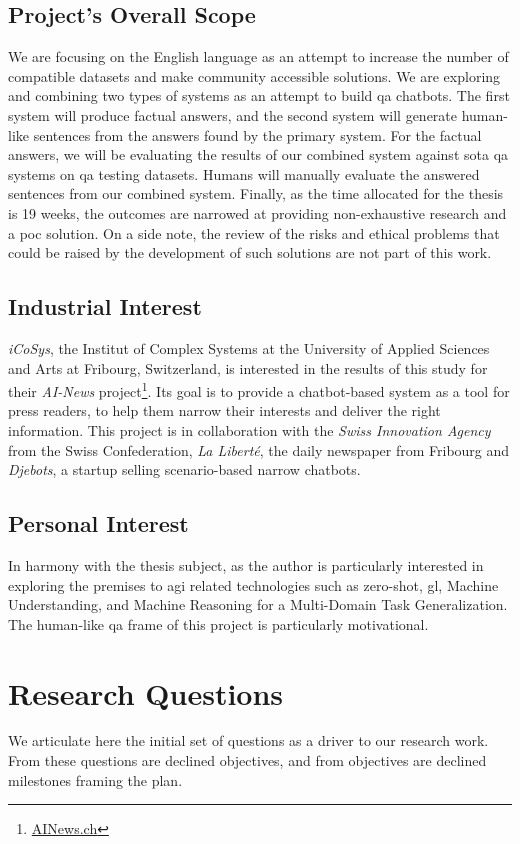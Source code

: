 \subsection{Project's Overall Scope}
We are focusing on the English language as an attempt to increase the number of compatible datasets and make community accessible solutions. We are exploring and combining two types of systems as an attempt to build \gls{qa} chatbots. The first system will produce factual answers, and the second system will generate human-like sentences from the answers found by the primary system. For the factual answers, we will be evaluating the results of our combined system against \gls{sota} \gls{qa} systems on \gls{qa} testing datasets. Humans will manually evaluate the answered sentences from our combined system. Finally, as the time allocated for the thesis is 19 weeks, the outcomes are narrowed at providing non-exhaustive research and a \gls{poc} solution. On a side note, the review of the risks and ethical problems that could be raised by the development of such solutions are not part of this work.


\subsection{Industrial Interest}
\textit{iCoSys}, the Institut of Complex Systems at the University of Applied Sciences and Arts at Fribourg, Switzerland, is interested in the results of this study for their \textit{AI-News} project\footnote{\url{AINews.ch}}. Its goal is to provide a chatbot-based system as a tool for press readers, to help them narrow their interests and deliver the right information. This project is in collaboration with the \textit{Swiss Innovation Agency} from the Swiss Confederation, \textit{La Liberté}, the daily newspaper from Fribourg and \textit{Djebots}, a startup selling scenario-based narrow chatbots.

\subsection{Personal Interest}
In harmony with the thesis subject, as the author is particularly interested in exploring the premises to \gls{agi} related technologies such as \gls{zero-shot}, \gls{gl}, Machine Understanding, and Machine Reasoning for a Multi-Domain Task Generalization. The human-like \gls{qa} frame of this project is particularly motivational.

\section{Research Questions}
We articulate here the initial set of questions as a driver to our research work. From these questions are declined objectives, and from objectives are declined milestones framing the plan.

